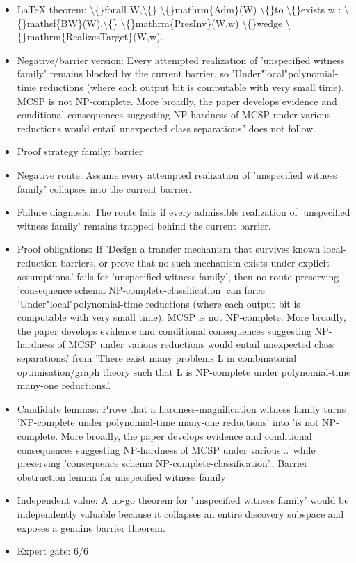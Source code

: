 \documentclass[11pt]{article}
\begin{document}
\begin{itemize}
\item LaTeX theorem: \textbackslash\{\}forall W,\textbackslash\{\} \textbackslash\{\}mathrm\{Adm\}(W) \textbackslash\{\}to \textbackslash\{\}exists w : \textbackslash\{\}mathsf\{BW\}(W),\textbackslash\{\} \textbackslash\{\}mathrm\{PresInv\}(W,w) \textbackslash\{\}wedge \textbackslash\{\}mathrm\{RealizesTarget\}(W,w).
\item Negative/barrier version: Every attempted realization of 'unspecified witness family' remains blocked by the current barrier, so 'Under"local"polynomial-time reductions (where each output bit is computable with very small time), MCSP is not NP-complete. More broadly, the paper develops evidence and conditional consequences suggesting NP-hardness of MCSP under various reductions would entail unexpected class separations.' does not follow.
\item Proof strategy family: barrier
\item Negative route: Assume every attempted realization of 'unspecified witness family' collapses into the current barrier.
\item Failure diagnosis: The route fails if every admissible realization of 'unspecified witness family' remains trapped behind the current barrier.
\item Proof obligations: If 'Design a transfer mechanism that survives known local-reduction barriers, or prove that no such mechanism exists under explicit assumptions.' fails for 'unspecified witness family', then no route preserving 'consequence schema NP-complete-classification' can force 'Under"local"polynomial-time reductions (where each output bit is computable with very small time), MCSP is not NP-complete. More broadly, the paper develops evidence and conditional consequences suggesting NP-hardness of MCSP under various reductions would entail unexpected class separations.' from 'There exist many problems L in combinatorial optimisation/graph theory such that L is NP-complete under polynomial-time many-one reductions.'.
\item Candidate lemmas: Prove that a hardness-magnification witness family turns 'NP-complete under polynomial-time many-one reductions' into 'is not NP-complete. More broadly, the paper develops evidence and conditional consequences suggesting NP-hardness of MCSP under various...' while preserving 'consequence schema NP-complete-classification'.; Barrier obstruction lemma for unspecified witness family
\item Independent value: A no-go theorem for 'unspecified witness family' would be independently valuable because it collapses an entire discovery subspace and exposes a genuine barrier theorem.
\item Expert gate: 6/6
\end{itemize}
\end{document}
